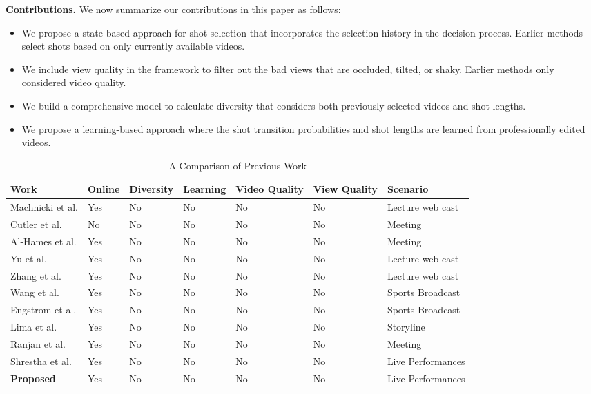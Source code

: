 \documentclass{sig-alternate-05-2015}
\begin{document}
\textbf{Contributions.} We now summarize our contributions in this paper as follows:
\begin{itemize}
\item We propose a state-based approach for shot selection that incorporates the selection history in the decision process. Earlier methods select shots based on only currently available
videos.
\item We include view quality in the framework to filter out the
bad views that are occluded, tilted, or shaky. Earlier methods
only considered video quality.
\item We build a comprehensive model to calculate diversity that
considers both previously selected videos and shot lengths.
\item We propose a learning-based approach where the shot transition probabilities and shot lengths are learned from professionally edited videos.
\end{itemize}
\begin{table}
\centering
\caption{A Comparison of Previous Work}
 \begin{tabular}{l | l|l| l | l |l |l } 
 \hline
 Work & Online & Diversity & Learning & Video Quality & View Quality & Scenario \\
 \hline
 Machnicki et al. \cite{9} & Yes & No &  No & No & No & Lecture web cast \\ 
 \hline
 Cutler et al.\cite{6} & No & No &  No & No & No & Meeting \\
 \hline
 Al-Hames et al.\cite{3} & Yes & No &  No & No & No & Meeting\\
 \hline
 Yu et al. \cite{20} & Yes & No &  No & No & No & Lecture web cast \\
 \hline
 Zhang et al. \cite{20} & Yes & No &  No & No & No & Lecture web cast\\ 
 \hline
 Wang et al. \cite{16} & Yes & No &  No & No & No & Sports Broadcast\\ 
 \hline
 Engstrom et al. \cite{8} & Yes & No &  No & No & No & Sports Broadcast\\ 
 \hline
 Lima et al. \cite{7} & Yes & No &  No & No & No & Storyline\\ 
 \hline
 Ranjan et al. \cite{12} & Yes & No &  No & No & No & Meeting\\ 
 \hline
 Shrestha et al. \cite{15} & Yes & No &  No & No & No & Live Performances\\ 
 \hline
 \textbf{Proposed} & Yes & No &  No & No & No & Live Performances \\ 
 \hline
 \end{tabular}
\end{table}
\end{document}
